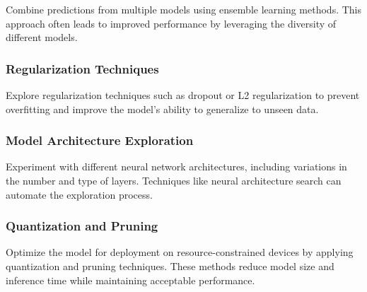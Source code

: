 Combine predictions from multiple models using ensemble learning methods. This approach often leads to improved performance by leveraging the diversity of different models.

\subsubsection{Regularization Techniques}

Explore regularization techniques such as dropout or L2 regularization to prevent overfitting and improve the model's ability to generalize to unseen data.

\subsubsection{Model Architecture Exploration}

Experiment with different neural network architectures, including variations in the number and type of layers. Techniques like neural architecture search can automate the exploration process.


\subsubsection{Quantization and Pruning}

Optimize the model for deployment on resource-constrained devices by applying quantization and pruning techniques. These methods reduce model size and inference time while maintaining acceptable performance.







